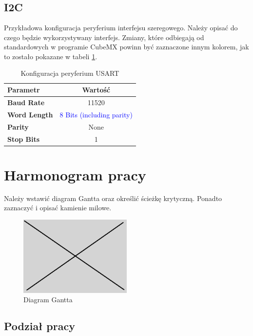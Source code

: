 \documentclass[10pt, a4paper]{article}
\begin{document}
\subsection{I2C}

Przykładowa konfiguracja peryferium interfejsu szeregowego.
Należy opisać do czego będzie wykorzystywany interfejs. 
Zmiany, które odbiegają od standardowych w programie CubeMX 
powinn być zaznaczone innym kolorem, jak to zostało pokazane 
w tabeli \ref{tab:USART}.

\begin{table}[H]
	\centering
	\begin{tabular}{|l|c|} \hline
		\textbf{Parametr} & Wartość \\
		\hline
		\hline  \textbf{Baud Rate}&11520  \\\hline
		\textbf{Word Length } & \textcolor{blue}{8 Bits (including parity)}\\\hline
		\textbf{Parity} &  None\\
		\hline
		\textbf{Stop Bits}& 1\\
		\hline
	\end{tabular}
	\caption{Konfiguracja peryferium USART}
	\label{tab:USART}
\end{table}


\section{Harmonogram pracy}

Należy wstawić diagram Gantta oraz określić ścieżkę 
krytyczną. Ponadto zaznaczyć i opisać kamienie milowe.

\begin{figure}[H]
	\centering
	\includegraphics[width=0.5\textwidth]{obraz.png}
	\caption{Diagram Gantta}
	\label{fig:DiagramGantta}
\end{figure}

\subsection{Podział pracy}
\end{document}
